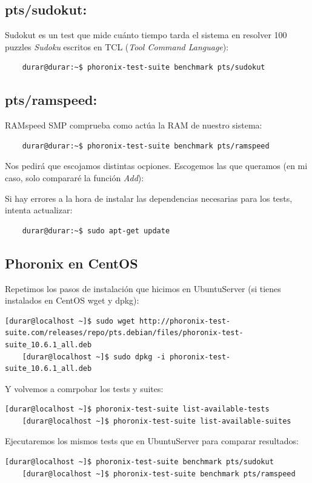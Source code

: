 \documentclass[a4paper]{article}
\begin{document}
\subsection*{\textbf{pts/sudokut:}}
Sudokut es un test que mide cuánto tiempo tarda el sistema en resolver 100 puzzles 
\textsl{Sudoku} escritos en TCL (\textsl{Tool Command Language}):
\begin{lstlisting}
    durar@durar:~$ phoronix-test-suite benchmark pts/sudokut 
\end{lstlisting}
\subsection*{\textbf{pts/ramspeed:}}
RAMspeed SMP comprueba como actúa la RAM de nuestro sistema:
\begin{lstlisting}
    durar@durar:~$ phoronix-test-suite benchmark pts/ramspeed 
\end{lstlisting}
Nos pedirá que escojamos distintas ocpiones. Escogemos las que queramos (en mi caso, 
solo compararé la función \textsl{Add}):

Si hay errores a la hora de instalar las dependencias necesarias para los tests, 
intenta actualizar:
\begin{lstlisting}
    durar@durar:~$ sudo apt-get update
\end{lstlisting}

\subsection{Phoronix en CentOS}
Repetimos los pasos de instalación que hicimos en UbuntuServer (si tienes instalados
en CentOS wget y dpkg):
\begin{lstlisting}[style=bashCentOS]
    [durar@localhost ~]$ sudo wget http://phoronix-test-suite.com/releases/repo/pts.debian/files/phoronix-test-suite_10.6.1_all.deb
    [durar@localhost ~]$ sudo dpkg -i phoronix-test-suite_10.6.1_all.deb
\end{lstlisting}
Y volvemos a comrpobar los tests y suites:
\begin{lstlisting}[style=bashCentOS]
    [durar@localhost ~]$ phoronix-test-suite list-available-tests
    [durar@localhost ~]$ phoronix-test-suite list-available-suites
\end{lstlisting}
Ejecutaremos los mismos tests que en UbuntuServer para comparar resultados:
\begin{lstlisting}[style=bashCentOS]
    [durar@localhost ~]$ phoronix-test-suite benchmark pts/sudokut
    [durar@localhost ~]$ phoronix-test-suite benchmark pts/ramspeed
\end{lstlisting}
\end{document}
